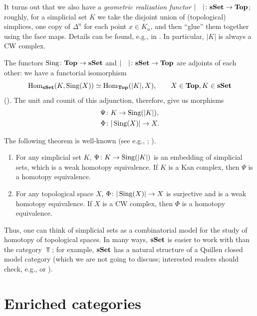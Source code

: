 It turns out that we also have a \emph{geometric realization
functor} $|\quad|\colon \mathbf{sSet}\to \mathbf{Top}$;
roughly, for a simplicial set $K$ we take the disjoint union of (topological)
simplices, one copy of $\Delta^n$ for each point $x\in K_n$, and then ``glue''
them together using the face maps. Details can be found, e.g., in
\cite[Chapter III]{may}. In particular, $|K|$ is always a CW complex.

The functors $\operatorname{Sing}\colon \mathbf{Top}\to \mathbf{sSet}$ and $|\quad|\colon \mathbf{sSet}\to \mathbf{Top}$ are
adjoints of each other: we have a functorial isomorphism
$$
  \operatorname{Hom}_{\mathbf{sSet}}(K, \operatorname{Sing}(X))\simeq \operatorname{Hom}_{\mathbf{Top}}(|K|, X),
  \qquad X\in \mathbf{Top}, K\in \mathbf{sSet}
$$
(\cite[\S 15]{may}). The unit and counit of this adjunction, therefore,
give us morphisms
\begin{align*}
  \Psi&\colon K\to \operatorname{Sing}(|K|),\\
  \Phi&\colon |\operatorname{Sing}(X)|\to X.
\end{align*}

The following theorem is well-known (see e.g., \cite[\S 16]{may};
\cite[Theorem I.11.4]{goerss-jardine}).
\begin{theorem} \label{t:sset-top}
\par\noindent
  \begin{enumerate}
    \item For any simplicial set $K$, $\Psi\colon K\to \operatorname{Sing}(|K|)$ is an
      embedding of simplicial sets, which is a weak homotopy equivalence.
      If $K$ is a Kan complex, then $\Psi$ is a homotopy equivalence.
    \item
      For any topological space $X$, $\Phi\colon |\operatorname{Sing}(X)|\to X$ is surjective
      and is a weak homotopy equivalence. If $X$ is a CW complex, then $\Phi$
      is a homotopy equivalence.
  \end{enumerate}
\end{theorem}

Thus, one can think of simplicial sets as a combinatorial model for the study of
homotopy of topological spaces. In many ways, $\mathbf{sSet}$ is easier to work with
than the category $\Top$; for example, $\mathbf{sSet}$ has a natural structure of a
Quillen closed model category (which we are not going to discuss; interested
readers should check, e.g., \cite[Section 7]{simpson} or
\cite[Section I.11]{goerss-jardine}).



\section{Enriched categories}\label{s:enriched-cat}

